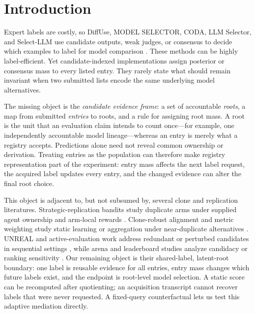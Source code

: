 \section{Introduction}
\label{sec:introduction}



Expert labels are costly, so DiffUse, MODEL SELECTOR, CODA, LLM Selector, and Select-LLM use candidate outputs, weak judges, or consensus to decide which examples to label for model comparison \citep{ashurytahan2024diffuse,okanovic2025modelselector,kay2025coda,durmazkeser2025llmselector,durmazkeser2026selectllm}. These methods can be highly label-efficient. Yet candidate-indexed implementations assign posterior or consensus mass to every listed entry. They rarely state what should remain invariant when two submitted lists encode the same underlying model alternatives.

The missing object is the \emph{candidate evidence frame}: a set of accountable \emph{roots}, a map from submitted \emph{entries} to roots, and a rule for assigning root mass. A root is the unit that an evaluation claim intends to count once---for example, one independently accountable model lineage---whereas an entry is merely what a registry accepts. Predictions alone need not reveal common ownership or derivation. Treating entries as the population can therefore make registry representation part of the experiment: entry mass affects the next label request, the acquired label updates every entry, and the changed evidence can alter the final root choice.

This object is adjacent to, but not subsumed by, several clone and replication literatures. Strategic-replication bandits study duplicate arms under supplied agent ownership and arm-local rewards \citep{shin2022strategicreplication,shin2025replicationproof}. Clone-robust alignment and metric weighting study static learning or aggregation under near-duplicate alternatives \citep{procaccia2025clonerobust,berriaud2026consensus}. UNREAL and active-evaluation work address redundant or perturbed candidates in sequential settings \citep{nguyen2025unreal,lanctot2026activeevaluation}, while arena and leaderboard studies analyze candidacy or ranking sensitivity \citep{singh2025leaderboard,huang2026dropping,hays2026strategic}. Our remaining object is their shared-label, latent-root boundary: one label is reusable evidence for all entries, entry mass changes which future labels exist, and the endpoint is root-level model selection. A static score can be recomputed after quotienting; an acquisition transcript cannot recover labels that were never requested. A fixed-query counterfactual lets us test this adaptive mediation directly.

